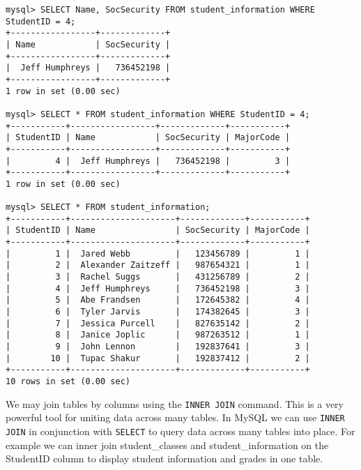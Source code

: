{\begin{lstlisting}
mysql> SELECT Name, SocSecurity FROM student_information WHERE StudentID = 4;
+-----------------+-------------+
| Name            | SocSecurity |
+-----------------+-------------+
|  Jeff Humphreys |   736452198 |
+-----------------+-------------+
1 row in set (0.00 sec)

mysql> SELECT * FROM student_information WHERE StudentID = 4;
+-----------+-----------------+-------------+-----------+
| StudentID | Name            | SocSecurity | MajorCode |
+-----------+-----------------+-------------+-----------+
|         4 |  Jeff Humphreys |   736452198 |         3 |
+-----------+-----------------+-------------+-----------+
1 row in set (0.00 sec)

mysql> SELECT * FROM student_information;
+-----------+---------------------+-------------+-----------+
| StudentID | Name                | SocSecurity | MajorCode |
+-----------+---------------------+-------------+-----------+
|         1 |  Jared Webb         |   123456789 |         1 |
|         2 |  Alexander Zaitzeff |   987654321 |         1 |
|         3 |  Rachel Suggs       |   431256789 |         2 |
|         4 |  Jeff Humphreys     |   736452198 |         3 |
|         5 |  Abe Frandsen       |   172645382 |         4 |
|         6 |  Tyler Jarvis       |   174382645 |         3 |
|         7 |  Jessica Purcell    |   827635142 |         2 |
|         8 |  Janice Joplic      |   987263512 |         1 |
|         9 |  John Lennon        |   192837641 |         3 |
|        10 |  Tupac Shakur       |   192837412 |         2 |
+-----------+---------------------+-------------+-----------+
10 rows in set (0.00 sec)

\end{lstlisting}

We may join tables by columns using the {\tt INNER JOIN} command.  This is a very powerful tool for uniting data across many tables.  In MySQL we can use {\tt INNER JOIN} in conjunction with {\tt SELECT} to query data across many tables into place.  For example we can inner join student_classes and student_information on the StudentID column to display student information and grades in one table.

\begin{lstlisting}


\end{lstlisting}}
